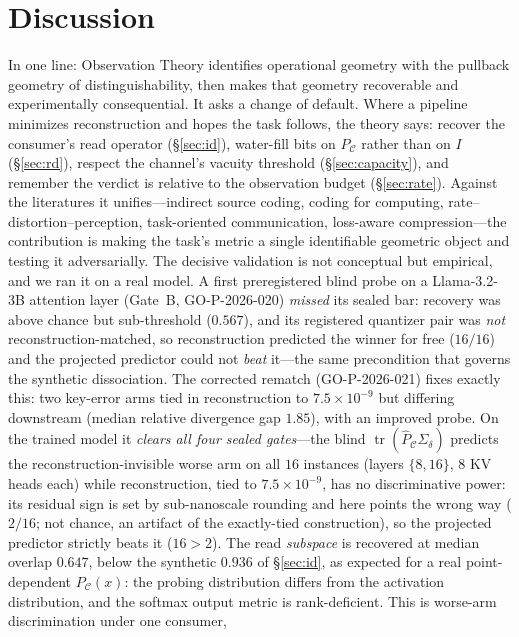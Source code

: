 \documentclass[11pt]{article}
\theoremstyle{definition}
\theoremstyle{remark}
\newcommand{\PC}{P_{\mathcal{C}}}
\newcommand{\Sd}{\Sigma_{\delta}}
\newcommand{\tr}{\operatorname{tr}}
\begin{document}
\section{Discussion}\label{sec:discussion}

In one line: Observation Theory identifies operational geometry with the pullback
geometry of distinguishability, then makes that geometry recoverable and
experimentally consequential. It asks a change of default. Where a pipeline minimizes
reconstruction and hopes the task follows, the theory says: recover the consumer's
read operator (\S\ref{sec:id}), water-fill bits on $\PC$ rather than on $I$
(\S\ref{sec:rd}), respect the channel's vacuity threshold (\S\ref{sec:capacity}), and
remember the verdict is relative to the observation budget (\S\ref{sec:rate}). Against
the literatures it unifies---indirect source coding, coding for computing,
rate--distortion--perception, task-oriented communication, loss-aware
compression---the contribution is making the task's metric a single identifiable
geometric object and testing it adversarially. The decisive validation is not
conceptual but empirical, and we ran it on a real model. A first preregistered blind
probe on a Llama-3.2-3B attention layer (Gate~B, GO-P-2026-020) \emph{missed} its
sealed bar: recovery was above chance but sub-threshold ($0.567$), and its registered
quantizer pair was \emph{not} reconstruction-matched, so reconstruction predicted the
winner for free ($16/16$) and the projected predictor could not \emph{beat} it---the
same precondition that governs the synthetic dissociation. The corrected rematch
(GO-P-2026-021) fixes exactly this: two key-error arms tied in reconstruction to
$7.5\!\times\!10^{-9}$ but differing downstream (median relative divergence gap
$1.85$), with an improved probe. On the trained model it \emph{clears all four sealed
gates}---the blind $\tr(\hat\PC\Sd)$ predicts the reconstruction-invisible worse arm
on all $16$ instances (layers $\{8,16\}$, $8$ KV heads each) while reconstruction, tied
to $7.5\!\times\!10^{-9}$, has no discriminative power: its residual sign is set by
sub-nanoscale rounding and here points the wrong way ($2/16$; not chance, an artifact
of the exactly-tied construction), so the projected predictor strictly beats it
($16>2$). The read \emph{subspace} is recovered at median overlap $0.647$, below the
synthetic $0.936$ of \S\ref{sec:id}, as expected for a real point-dependent $\PC(x)$:
the probing distribution differs from the activation distribution, and the softmax
output metric is rank-deficient. This is worse-arm discrimination under one consumer,
\end{document}
